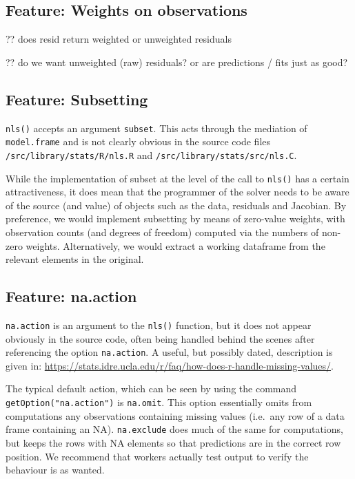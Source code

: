 \documentclass[
]{article}
\begin{document}
\hypertarget{feature-weights-on-observations}{%
\subsection{Feature: Weights on
observations}\label{feature-weights-on-observations}}

?? does resid return weighted or unweighted residuals

?? do we want unweighted (raw) residuals? or are predictions / fits just
as good?

\hypertarget{feature-subsetting}{%
\subsection{Feature: Subsetting}\label{feature-subsetting}}

\texttt{nls()} accepts an argument \texttt{subset}. This acts through
the mediation of \texttt{model.frame} and is not clearly obvious in the
source code files \texttt{/src/library/stats/R/nls.R} and
\texttt{/src/library/stats/src/nls.C}.

While the implementation of subset at the level of the call to
\texttt{nls()} has a certain attractiveness, it does mean that the
programmer of the solver needs to be aware of the source (and value) of
objects such as the data, residuals and Jacobian. By preference, we
would implement subsetting by means of zero-value weights, with
observation counts (and degrees of freedom) computed via the numbers of
non-zero weights. Alternatively, we would extract a working dataframe
from the relevant elements in the original.

\hypertarget{feature-na.action}{%
\subsection{Feature: na.action}\label{feature-na.action}}

\texttt{na.action} is an argument to the \texttt{nls()} function, but it
does not appear obviously in the source code, often being handled behind
the scenes after referencing the option \texttt{na.action}. A useful,
but possibly dated, description is given in:
\url{https://stats.idre.ucla.edu/r/faq/how-does-r-handle-missing-values/}.

The typical default action, which can be seen by using the command
\texttt{getOption("na.action")} is \texttt{na.omit}. This option
essentially omits from computations any observations containing missing
values (i.e.~any row of a data frame containing an NA).
\texttt{na.exclude} does much of the same for computations, but keeps
the rows with NA elements so that predictions are in the correct row
position. We recommend that workers actually test output to verify the
behaviour is as wanted.
\end{document}
